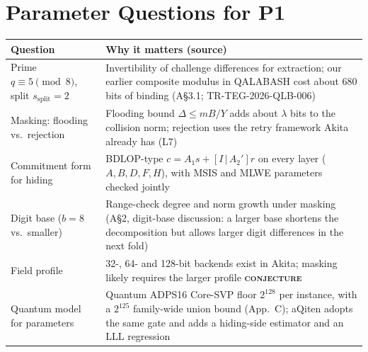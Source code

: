 \documentclass[11pt]{article}
\newcommand{\epitag}[3]{\colorbox{#2}{\textcolor{#1}{\textsc{\footnotesize\bfseries #3}}}}
\newcommand{\conjectureTag}{\epitag{conjyellow}{conjbg}{conjecture}}
\renewcommand{\_}{\textunderscore\allowbreak{}}
\theoremstyle{definition}
\begin{document}
\section{Parameter Questions for P1}
\begin{center}
\small\renewcommand{\arraystretch}{1.2}
\begin{tabular}{@{}p{}p{}@{}}
\toprule
\textbf{Question} & \textbf{Why it matters (source)}\\
\midrule
Prime $q\equiv5 \pmod 8$, split $s_{\mathrm{split}}=2$ & Invertibility of challenge differences for extraction; our earlier composite modulus in QALABASH cost about $680$ bits of binding (A\S3.1; TR-TEG-2026-QLB-006)\\
Masking: flooding vs.\ rejection & Flooding bound $\Delta\le mB/Y$ adds about $\lambda$ bits to the collision norm; rejection uses the retry framework Akita already has (L7)\\
Commitment form for hiding & BDLOP-type $c=A_1s+[I\,|\,A_2']r$ on every layer ($A,B,D,F,H$), with MSIS and MLWE parameters checked jointly\\
Digit base ($b=8$ vs.\ smaller) & Range-check degree and norm growth under masking (A\S2, digit-base discussion: a larger base shortens the decomposition but allows larger digit differences in the next fold)\\
Field profile & 32-, 64- and 128-bit backends exist in Akita; masking likely requires the larger profile \conjectureTag\\
Quantum model for parameters & Quantum ADPS16 Core-SVP floor $2^{128}$ per instance, with a $2^{125}$ family-wide union bound (App.~C); aQiten adopts the same gate and adds a hiding-side estimator and an LLL regression\\
\bottomrule
\end{tabular}
\end{center}
\end{document}
